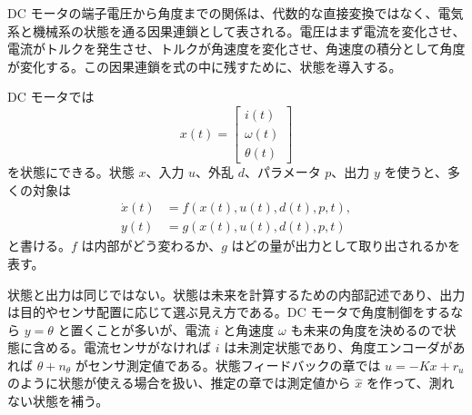 DC モータの端子電圧から角度までの関係は、代数的な直接変換ではなく、電気系と機械系の状態を通る因果連鎖として表される。電圧はまず電流を変化させ、電流がトルクを発生させ、トルクが角速度を変化させ、角速度の積分として角度が変化する。この因果連鎖を式の中に残すために、状態を導入する。

DC モータでは
\begin{equation}
  x(t)=\begin{bmatrix}i(t)\\ \omega(t)\\ \theta(t)\end{bmatrix}
\end{equation}
を状態にできる。状態 $x$、入力 $u$、外乱 $d$、パラメータ $p$、出力 $y$ を使うと、多くの対象は
\begin{align}
  \dot{x}(t)&=f(x(t),u(t),d(t),p,t),\label{eq:nonlinear-state-model}\\
  y(t)&=g(x(t),u(t),d(t),p,t)
\end{align}
と書ける。$f$ は内部がどう変わるか、$g$ はどの量が出力として取り出されるかを表す。

状態と出力は同じではない。状態は未来を計算するための内部記述であり、出力は目的やセンサ配置に応じて選ぶ見え方である。DC モータで角度制御をするなら $y=\theta$ と置くことが多いが、電流 $i$ と角速度 $\omega$ も未来の角度を決めるので状態に含める。電流センサがなければ $i$ は未測定状態であり、角度エンコーダがあれば $\theta+n_\theta$ がセンサ測定値である。状態フィードバックの章では $u=-Kx+r_u$ のように状態が使える場合を扱い、推定の章では測定値から $\hat{x}$ を作って、測れない状態を補う。
